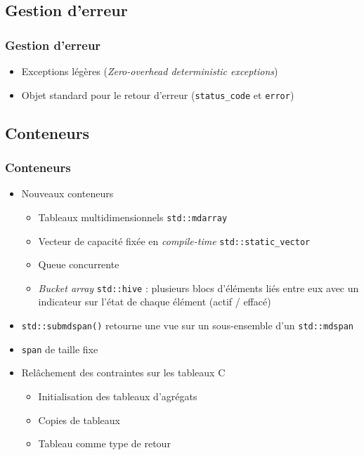 \documentclass[C++.tex]{subfiles}
\begin{document}
\subsection*{Gestion d'erreur}
\begin{frame}[fragile]
	\frametitle{Gestion d'erreur}
	\begin{itemize}
		\item Exceptions légères (\textit{Zero-overhead deterministic exceptions})
		\item Objet standard pour le retour d'erreur (\lstinline|status_code| et \lstinline|error|)
	\end{itemize}
\end{frame}

\subsection*{Conteneurs}
\begin{frame}[fragile]
	\frametitle{Conteneurs}
	\begin{itemize}
		\item Nouveaux conteneurs
			\begin{itemize}
				\item Tableaux multidimensionnels \lstinline|std::mdarray|


			\item Vecteur de capacité fixée en \textit{compile-time} \lstinline|std::static_vector|


			\item Queue concurrente
			\item \textit{Bucket array} \lstinline|std::hive| : plusieurs blocs d'éléments liés entre eux avec un indicateur sur l'état de chaque élément (actif / effacé)
		\end{itemize}
		\item \lstinline|std::submdspan()| retourne une vue sur un sous-ensemble d'un \lstinline|std::mdspan|
		\item \lstinline|span| de taille fixe
		\item Relâchement des contraintes sur les tableaux C
		\begin{itemize}
			\item Initialisation des tableaux d'agrégats
			\item Copies de tableaux
			\item Tableau comme type de retour
		\end{itemize}

	\end{itemize}
\end{frame}
\end{document}
